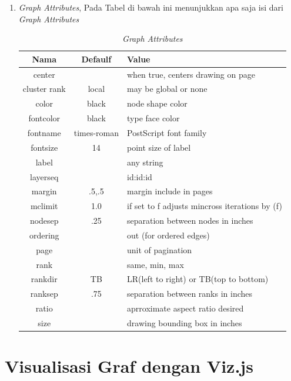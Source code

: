 \begin{enumerate}
\begin{enumerate}
\item \textit{Graph Attributes}, Pada Tabel di bawah ini menunjukkan apa saja isi dari \textit{Graph Attributes}

\begin{table}[htbp]
\begin{center}
\caption{\textit{Graph Attributes}}
\begin{tabular}{|c|c|l|}
\hline
  Nama & Defaulf & Value \\
\hline
  center & & when true, centers drawing on page \\
  cluster rank & local & may be global or none \\
  color & black & node shape color \\
  fontcolor & black & type face color \\
  fontname & times-roman & PostScript font family \\
  fontsize & 14 & point size of label \\
  label & & any string \\
  layerseq & & id:id:id \\
  margin & .5,.5 & margin include in pages \\
  mclimit & 1.0 & if set to f adjusts mincross iterations by (f) \\
  nodesep & .25 & separation between nodes in inches \\
  ordering & & out (for ordered edges) \\
  page & & unit of pagination  \\
  rank & & same, min, max \\
  rankdir & TB & LR(left to right) or TB(top to bottom) \\
  ranksep & .75 & separation between ranks in inches \\
  ratio & & aprroximate aspect ratio desired \\
  size & & drawing bounding box in inches \\
\hline
\end{tabular}
\end{center}
\end{table}

\end{enumerate}
\end{enumerate}



\section{Visualisasi Graf dengan Viz.js}
\label{sec: Visualisasi Graf dengan Viz.js}

